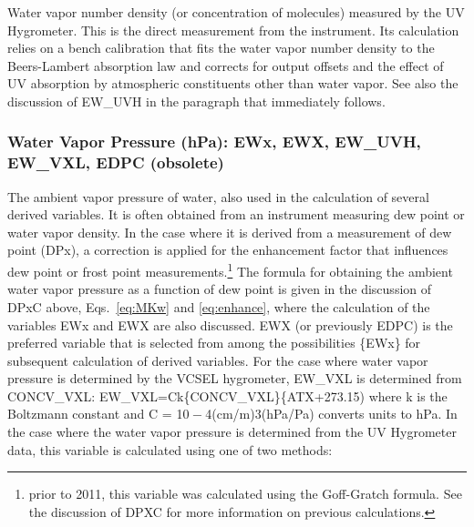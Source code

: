 \documentclass[
  english,
]{book}
\begin{document}
Water vapor number density (or concentration of molecules) measured by the UV Hygrometer. This is the direct measurement from the instrument. Its calculation relies on a bench calibration that fits the water vapor number density to the Beers-Lambert absorption law and corrects for output offsets and the effect of UV absorption by atmospheric constituents other than water vapor. See also the discussion of EW\_UVH in the paragraph that immediately follows.

\hypertarget{ewx}{%
\subsubsection*{Water Vapor Pressure (hPa): EWx, EWX, EW\_UVH, EW\_VXL, EDPC (obsolete)}\label{ewx}}

The ambient vapor pressure of water, also used in the calculation of several derived variables. It is often obtained from an instrument measuring dew point or water vapor density. In the case where it is derived from a measurement of dew point (DPx), a correction is applied for the enhancement factor that influences dew point or frost point measurements.\footnote{prior to 2011, this variable was calculated using the Goff-Gratch formula. See the discussion of DPXC for more information on previous calculations.}
The formula for obtaining the ambient water vapor pressure as a function of dew point is given in the discussion of DPxC above, Eqs.~\eqref{eq:MKw} and \eqref{eq:enhance}, where the calculation of the variables EWx and EWX are also discussed. EWX (or previously EDPC) is the preferred variable that is selected from among the possibilities \{EWx\} for subsequent calculation of derived variables.
For the case where water vapor pressure is determined by the VCSEL hygrometer, EW\_VXL is determined from CONCV\_VXL: EW\_VXL={C}{k}\{CONCV\_VXL\}\{ATX+273.15) where {k} is the Boltzmann constant and {C = 10 − 4}(cm/m){3}(hPa/Pa) converts units to hPa.
In the case where the water vapor pressure is determined from the UV Hygrometer data, this variable is calculated using one of two methods:
\end{document}
